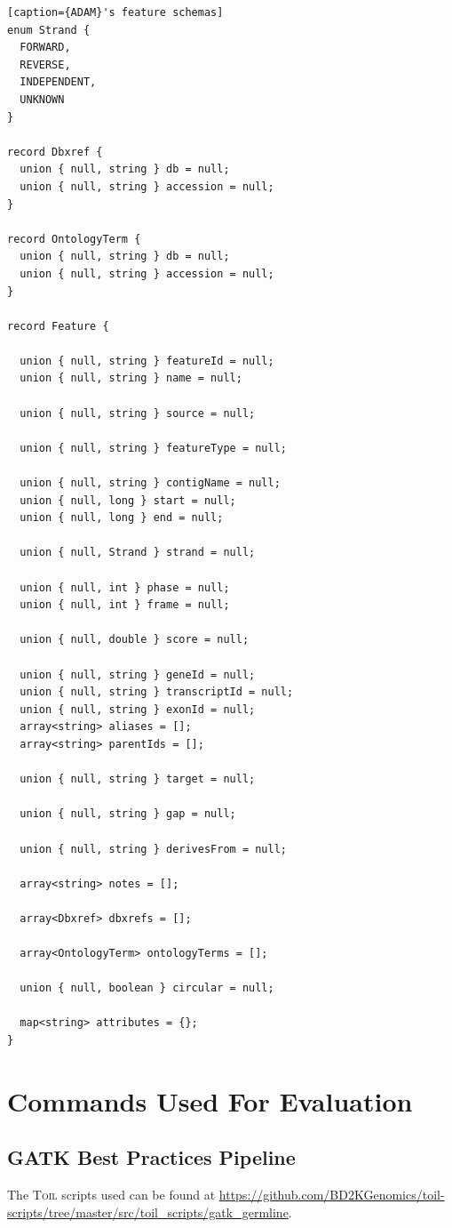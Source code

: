 \documentclass[phd]{ucbthesis}
\begin{document}
\begin{lstlisting}[caption={ADAM}'s feature schemas]
enum Strand {
  FORWARD,
  REVERSE,
  INDEPENDENT,
  UNKNOWN
}

record Dbxref {
  union { null, string } db = null;
  union { null, string } accession = null;
}

record OntologyTerm {
  union { null, string } db = null;
  union { null, string } accession = null;
}

record Feature {

  union { null, string } featureId = null;
  union { null, string } name = null;

  union { null, string } source = null;

  union { null, string } featureType = null;

  union { null, string } contigName = null;
  union { null, long } start = null;
  union { null, long } end = null;

  union { null, Strand } strand = null;

  union { null, int } phase = null;
  union { null, int } frame = null;

  union { null, double } score = null;

  union { null, string } geneId = null;
  union { null, string } transcriptId = null;
  union { null, string } exonId = null;
  array<string> aliases = [];
  array<string> parentIds = [];

  union { null, string } target = null;

  union { null, string } gap = null;

  union { null, string } derivesFrom = null;

  array<string> notes = [];

  array<Dbxref> dbxrefs = [];

  array<OntologyTerm> ontologyTerms = [];

  union { null, boolean } circular = null;

  map<string> attributes = {};
}
\end{lstlisting}

\chapter{Commands Used For Evaluation}
\label{sec:cmds}

\section{GATK Best Practices Pipeline}
\label{sec:gatk-best-practices}

The \textsc{Toil} scripts used can be found at
\url{https://github.com/BD2KGenomics/toil-scripts/tree/master/src/toil_scripts/gatk_germline}.

\backmatter



\end{document}
